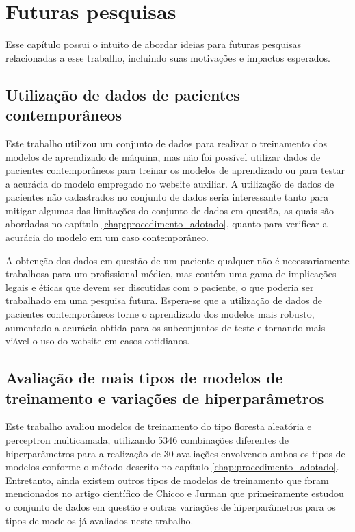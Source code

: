 \chapter{Futuras pesquisas} \label{chap:futuras_pesquisas}

Esse capítulo possui o intuito de abordar ideias para futuras pesquisas relacionadas a esse trabalho, incluindo suas motivações e impactos esperados.

\section{Utilização de dados de pacientes contemporâneos}

Este trabalho utilizou um conjunto de dados\cite{larxel_dataset} para realizar o treinamento dos modelos de aprendizado de máquina, mas não foi possível utilizar dados de pacientes contemporâneos para treinar os modelos de aprendizado ou para testar a acurácia do modelo empregado no website auxiliar. A utilização de dados de pacientes não cadastrados no conjunto de dados seria interessante tanto para mitigar algumas das limitações do conjunto de dados em questão, as quais são abordadas no capítulo \ref{chap:procedimento_adotado}, quanto para verificar a acurácia do modelo em um caso contemporâneo.

A obtenção dos dados em questão de um paciente qualquer não é necessariamente trabalhosa para um profissional médico, mas contém uma gama de implicações legais e éticas que devem ser discutidas com o paciente, o que poderia ser trabalhado em uma pesquisa futura. Espera-se que a utilização de dados de pacientes contemporâneos torne o aprendizado dos modelos mais robusto, aumentado a acurácia obtida para os subconjuntos de teste e tornando mais viável o uso do website em casos cotidianos.

\section{Avaliação de mais tipos de modelos de treinamento e variações de hiperparâmetros}

Este trabalho avaliou modelos de treinamento do tipo floresta aleatória e perceptron multicamada, utilizando 5346 combinações diferentes de hiperparâmetros para a realização de 30 avaliações envolvendo ambos os tipos de modelos conforme o método descrito no capítulo \ref{chap:procedimento_adotado}. Entretanto, ainda existem outros tipos de modelos de treinamento que foram mencionados no artigo científico de Chicco e Jurman\cite{chicco2020} que primeiramente estudou o conjunto de dados em questão e outras variações de hiperparâmetros para os tipos de modelos já avaliados neste trabalho.

